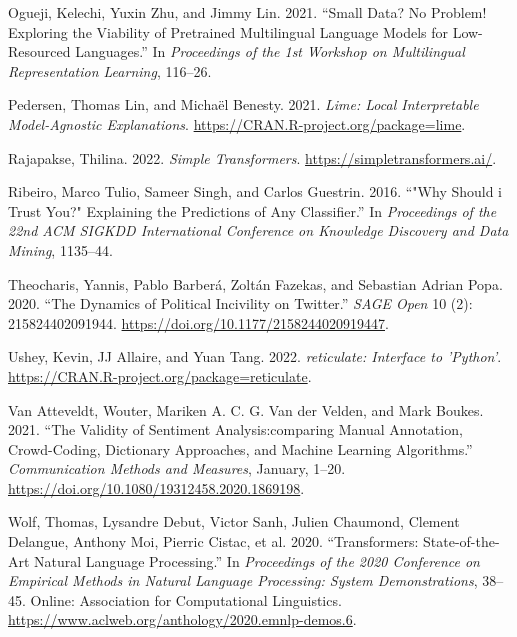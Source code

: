 \documentclass[
]{ccr}
\newlength{\cslhangindent}
\newlength{\cslentryspacingunit} %
\newenvironment{CSLReferences}[2] %
 {%
  \setlength{\parindent}{0pt}
  \ifodd #1
  \let\oldpar\par
  \def\par{\hangindent=\cslhangindent\oldpar}
  \fi
  \setlength{\parskip}{#2\cslentryspacingunit}
 }%
 {}
\begin{document}
\begin{CSLReferences}{1}{0}
\leavevmode{}%
Ogueji, Kelechi, Yuxin Zhu, and Jimmy Lin. 2021. {``Small Data? No
Problem! Exploring the Viability of Pretrained Multilingual Language
Models for Low-Resourced Languages.''} In \emph{Proceedings of the 1st
Workshop on Multilingual Representation Learning}, 116--26.

\leavevmode{}%
Pedersen, Thomas Lin, and Michaël Benesty. 2021. \emph{Lime: Local
Interpretable Model-Agnostic Explanations}.
\url{https://CRAN.R-project.org/package=lime}.

\leavevmode{}%
Rajapakse, Thilina. 2022. \emph{{Simple Transformers}}.
\url{https://simpletransformers.ai/}.

\leavevmode{}%
Ribeiro, Marco Tulio, Sameer Singh, and Carlos Guestrin. 2016. {``"Why
Should i Trust You?" Explaining the Predictions of Any Classifier.''} In
\emph{Proceedings of the 22nd ACM SIGKDD International Conference on
Knowledge Discovery and Data Mining}, 1135--44.

\leavevmode{}%
Theocharis, Yannis, Pablo Barberá, Zoltán Fazekas, and Sebastian Adrian
Popa. 2020. {``The Dynamics of Political Incivility on Twitter.''}
\emph{SAGE Open} 10 (2): 215824402091944.
\url{https://doi.org/10.1177/2158244020919447}.

\leavevmode{}%
Ushey, Kevin, JJ Allaire, and Yuan Tang. 2022. \emph{{reticulate:
Interface to 'Python'}}.
\url{https://CRAN.R-project.org/package=reticulate}.

\leavevmode{}%
Van Atteveldt, Wouter, Mariken A. C. G. Van der Velden, and Mark Boukes.
2021. {``The Validity of Sentiment Analysis:comparing Manual Annotation,
Crowd-Coding, Dictionary Approaches, and Machine Learning Algorithms.''}
\emph{Communication Methods and Measures}, January, 1--20.
\url{https://doi.org/10.1080/19312458.2020.1869198}.

\leavevmode{}%
Wolf, Thomas, Lysandre Debut, Victor Sanh, Julien Chaumond, Clement
Delangue, Anthony Moi, Pierric Cistac, et al. 2020. {``Transformers:
State-of-the-Art Natural Language Processing.''} In \emph{Proceedings of
the 2020 Conference on Empirical Methods in Natural Language Processing:
System Demonstrations}, 38--45. Online: Association for Computational
Linguistics. \url{https://www.aclweb.org/anthology/2020.emnlp-demos.6}.

\end{CSLReferences}
\end{document}
